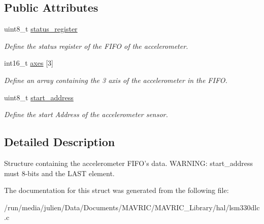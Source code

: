 \subsection*{Public Attributes}
\begin{DoxyCompactItemize}
\item 
\hypertarget{structlsm__acc__read__t_a10cab1112749a0bb8fb63e74891dc1f6}{uint8\+\_\+t \hyperlink{structlsm__acc__read__t_a10cab1112749a0bb8fb63e74891dc1f6}{status\+\_\+register}}\label{structlsm__acc__read__t_a10cab1112749a0bb8fb63e74891dc1f6}

\begin{DoxyCompactList}\small\item\em Define the status register of the F\+I\+F\+O of the accelerometer. \end{DoxyCompactList}\item 
\hypertarget{structlsm__acc__read__t_a3c6f2d492336d7d2e5b00bdec1783206}{int16\+\_\+t \hyperlink{structlsm__acc__read__t_a3c6f2d492336d7d2e5b00bdec1783206}{axes} \mbox{[}3\mbox{]}}\label{structlsm__acc__read__t_a3c6f2d492336d7d2e5b00bdec1783206}

\begin{DoxyCompactList}\small\item\em Define an array containing the 3 axis of the accelerometer in the F\+I\+F\+O. \end{DoxyCompactList}\item 
\hypertarget{structlsm__acc__read__t_a6eac5766c49ecc21651cd22518d79594}{uint8\+\_\+t \hyperlink{structlsm__acc__read__t_a6eac5766c49ecc21651cd22518d79594}{start\+\_\+address}}\label{structlsm__acc__read__t_a6eac5766c49ecc21651cd22518d79594}

\begin{DoxyCompactList}\small\item\em Define the start Address of the accelerometer sensor. \end{DoxyCompactList}\end{DoxyCompactItemize}


\subsection{Detailed Description}
Structure containing the accelerometer F\+I\+F\+O's data. W\+A\+R\+N\+I\+N\+G\+: start\+\_\+address must 8-\/bits and the L\+A\+S\+T element. 

The documentation for this struct was generated from the following file\+:\begin{DoxyCompactItemize}
\item 
/run/media/julien/\+Data/\+Documents/\+M\+A\+V\+R\+I\+C/\+M\+A\+V\+R\+I\+C\+\_\+\+Library/hal/lsm330dlc.\+c\end{DoxyCompactItemize}

